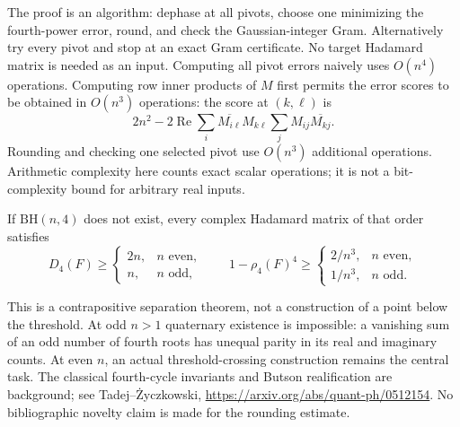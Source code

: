 The proof is an algorithm: dephase at all pivots, choose one minimizing
the fourth-power error, round, and check the Gaussian-integer Gram.
Alternatively try every pivot and stop at an exact Gram certificate.
No target Hadamard matrix is needed as an input. Computing all pivot
errors naively uses $O(n^4)$ operations. Computing row inner products
of $M$ first permits the error scores to be obtained in $O(n^3)$
operations: the score at $(k,\ell)$ is
\[
 2n^2-2\operatorname{Re}\sum_i
   \overline{M_{i\ell}}M_{k\ell}
   \sum_j M_{ij}\overline{M_{kj}}.
\]
Rounding and checking one selected pivot use $O(n^3)$ additional
operations. Arithmetic complexity here counts exact scalar operations;
it is not a bit-complexity bound for arbitrary real inputs.

\begin{corollary}
If $\mathrm{BH}(n,4)$ does not exist, every complex Hadamard matrix
of that order satisfies
\[
 D_4(F)\ge
 \begin{cases}2n,&n\text{ even},\\n,&n\text{ odd},\end{cases}
 \qquad
 1-\rho_4(F)^4\ge
 \begin{cases}2/n^3,&n\text{ even},\\1/n^3,&n\text{ odd}.\end{cases}
\]
\end{corollary}
This is a contrapositive separation theorem, not a construction of a
point below the threshold. At odd $n>1$ quaternary existence is
impossible: a vanishing sum of an odd number of fourth roots has
unequal parity in its real and imaginary counts. At even $n$,
an actual threshold-crossing construction remains the central task.
The classical fourth-cycle invariants and Butson realification are
background; see Tadej--\.Zyczkowski,
\url{https://arxiv.org/abs/quant-ph/0512154}.
No bibliographic novelty claim is made for the rounding estimate.

